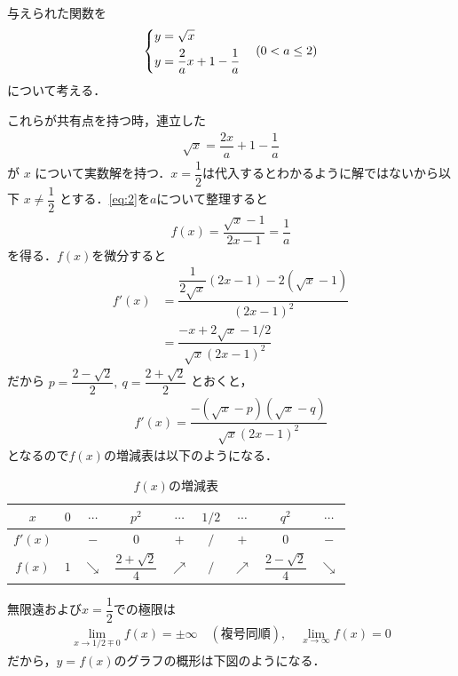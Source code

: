 \documentclass[../../main.tex]{subfiles}
\begin{document}
与えられた関数を
\begin{align}
  \begin{dcases}
    y=\sqrt{x} \\
    y=\dfrac{2}{a}x+1-\dfrac{1}{a}
  \end{dcases} \quad (0 < a \le 2) \label{eq:1}
\end{align}
について考える．

これらが共有点を持つ時，連立した
\begin{align}
  \sqrt{x} = \dfrac{2x}{a} + 1 - \dfrac{1}{a} \label{eq:2}
\end{align}
が $x$ について実数解を持つ．$ x = \dfrac{1}{2}$は代入するとわかるように解ではないから以下 $x \neq \dfrac{1}{2}$ とする．\cref{eq:2}を$a$について整理すると
\begin{align}
  f(x) = \dfrac{\sqrt{x}-1}{2x-1} = \dfrac{1}{a} \label{eq:3}
\end{align}
を得る．$f(x)$を微分すると
\begin{align}
  f'(x)
  & = \dfrac{\dfrac{1}{2\sqrt{x}}(2x-1) - 2(\sqrt{x}-1)}{(2x-1)^2} \\
  & = \dfrac{-x + 2\sqrt{x} - 1/2}{\sqrt{x}(2x-1)^2}
\end{align}
だから $p = \dfrac{2-\sqrt{2}}{2}, \ q = \dfrac{2+\sqrt{2}}{2}$ とおくと，
\begin{align}
  f'(x) = \dfrac{-(\sqrt{x}-p)(\sqrt{x}-q)}{\sqrt{x}(2x-1)^2}
\end{align}
となるので$f(x)$の増減表は以下のようになる．

\begin{table}[htb]
  \centering
  \caption{$f(x)$の増減表}
  \begin{tabular}{|c|c|c|c|c|c|c|c|c|}
    \hline
    $x$ & $0$ & $\cdots$ & $p^2$ & $\cdots$ & $1/2$ & $\cdots$ & $q^2$ & $\cdots$ \\ \hline
    $f'(x)$ & & $-$ & $0$ & $+$ & $/$ & $+$ & $0$ & $-$ \\ \hline
    $f(x)$ & $1$ & $\searrow$ & $\dfrac{2+\sqrt{2}}{4}$ & $\nearrow$ & $/$ & $\nearrow$ & $\dfrac{2-\sqrt{2}}{4}$ & $\searrow$ \\ \hline
  \end{tabular}
\end{table}

無限遠および$x=\dfrac{1}{2}$での極限は
\begin{align}
  \lim_{x \to 1/2 \mp 0} f(x) = \pm\infty \quad (\text{複号同順}),
  \quad
  \lim_{x\to\infty} f(x) = 0
\end{align}
だから，$y=f(x)$のグラフの概形は下図のようになる．
\end{document}
